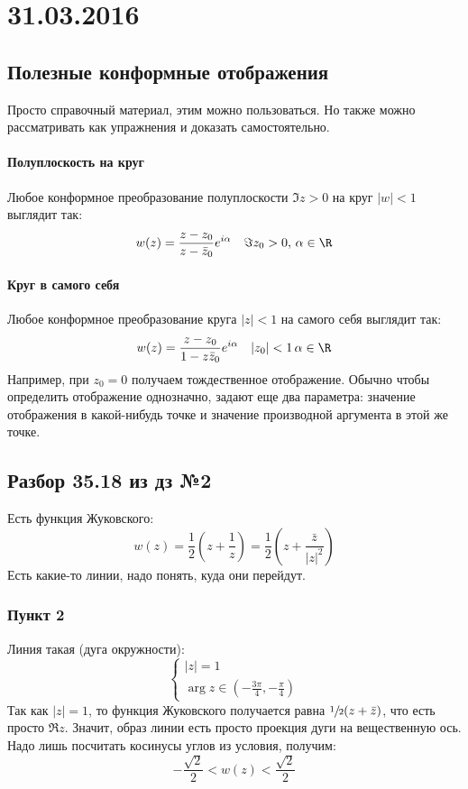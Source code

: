 \chapter{31.03.2016}

\section{Полезные конформные отображения}
	Просто справочный материал, этим можно пользоваться.
	Но также можно рассматривать как упражнения и доказать самостоятельно.

	\subsubsection{Полуплоскость на круг}
		Любое конформное преобразование полуплоскости $\Im z > 0$ на круг $|w|<1$ выглядит так:
		\[
			w(z) = \frac{z-z_0}{z-\bar z_0} e^{i\alpha} \quad \Im z_0 > 0,\, \alpha \in \R
		\]

	\subsubsection{Круг в самого себя}
		Любое конформное преобразование круга $|z|<1$ на самого себя выглядит так:
		\[
			w(z) = \frac{z-z_0}{1-z\bar z_0} e^{i\alpha} \quad |z_0| < 1\, \alpha \in \R
		\]
		Например, при $z_0=0$ получаем тождественное отображение.
		Обычно чтобы определить отображение однозначно, задают еще два параметра:
		значение отображения в какой-нибудь точке и значение производной аргумента в этой же точке.

\section{Разбор 35.18 из дз №2}
	Есть функция Жуковского:
	\[ w(z) = \frac12\left(z+\frac1z\right) = \frac12\left(z+\frac{\bar z}{|z|^2}\right) \]
	Есть какие-то линии, надо понять, куда они перейдут.
	\subsection{Пункт 2}
		Линия такая (дуга окружности):
		\[
			\begin{cases}
				|z|=1 \\
				\arg z \in \left(-\frac{3\pi}{4}, -\frac{\pi}{4}\right)
			\end{cases}
		\]
		Так как $|z|=1$, то функция Жуковского получается равна $\sfrac 12(z+\bar z)$,
		что есть просто $\Re z$.
		Значит, образ линии есть просто проекция дуги на вещественную ось.
		Надо лишь посчитать косинусы углов из условия, получим:
		\[ -\frac{\sqrt2}{2} < w(z) < \frac{\sqrt 2}{2} \]

